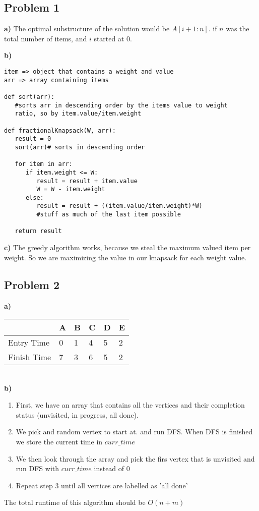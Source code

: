 \documentclass[12pt]{article}
\begin{document}
\subsection*{Problem 1}
\textbf{a)}
The optimal substructure of the solution would be $A[i + 1:n]$. if $n$ was the total number of items, and $i$ started at $0$.

\textbf{b)} 
\begin{verbatim}
item => object that contains a weight and value
arr => array containing items

def sort(arr):
   #sorts arr in descending order by the items value to weight
   ratio, so by item.value/item.weight

def fractionalKnapsack(W, arr):
   result = 0
   sort(arr)# sorts in descending order

   for item in arr:
      if item.weight <= W:
         result = result + item.value
         W = W - item.weight
      else:
         result = result + ((item.value/item.weight)*W)
         #stuff as much of the last item possible
         
   return result
\end{verbatim}

\textbf{c)}
The greedy algorithm works, because we steal the maximum valued item per weight. So we are maximizing the value in our knapsack for each weight value.
\newpage
\subsection*{Problem 2}
\textbf{a)}
\begin{table}[!h]
\centering
\begin{tabular}{|l|l|l|l|l|l|}
\hline
 & A & B & C & D & E \\ \hline
Entry Time & 0 & 1 & 4 & 5 & 2 \\ \hline
Finish Time & 7 & 3 & 6 & 5 & 2 \\ \hline
\end{tabular}
\end{table}\\
\textbf{b)}
\begin{enumerate}
\item First, we have an array that contains all the vertices and their completion status (unvisited, in progress, all done).
\item We pick and random vertex to start at. and run DFS. When DFS is finished we store the current time in $curr\_time$
\item We then look through the array and pick the firs vertex that is unvisited and run DFS with $curr\_time$ instead of 0
\item Repeat step 3 until all vertices are labelled as 'all done'
\end{enumerate}
The total runtime of this algorithm should be $O(n + m)$
\end{document}
